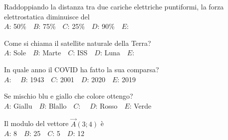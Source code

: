 \mcquestionfooter



\def\mcquestionnumber{2}


\mcquestionheader Raddoppiando la distanza tra due cariche elettriche puntiformi, la forza elettrostatica diminuisce del\\
{$A$}: 50\%\ \ {$B$}: 75\%\ \ {$C$}: 25\%\ \ {$D$}: 90\%\ \ {$E$}: \ \ 

\mcquestionfooter



\def\mcquestionnumber{3}


\mcquestionheader Come si chiama il satellite naturale della Terra?\\
{$A$}: Sole\ \ {$B$}: Marte\ \ {$C$}: ISS\ \ {$D$}: Luna\ \ {$E$}: \ \ 

\mcquestionfooter



\def\mcquestionnumber{4}


\mcquestionheader In quale anno il COVID ha fatto la sua comparsa?\\
{$A$}: \ \ {$B$}: 1943\ \ {$C$}: 2001\ \ {$D$}: 2020\ \ {$E$}: 2019\ \ 

\mcquestionfooter



\def\mcquestionnumber{5}


\mcquestionheader Se mischio blu e giallo che colore ottengo?\\
{$A$}: Giallu\ \ {$B$}: Blallo\ \ {$C$}: \ \ {$D$}: Rosso\ \ {$E$}: Verde\ \ 

\mcquestionfooter



\def\mcquestionnumber{6}


\mcquestionheader Il modulo del vettore $\vec{A}(3;4)$ è\\
{$A$}: 8\ \ {$B$}: 25\ \ {$C$}: 5\ \ {$D$}: 12\ \ 

\mcquestionfooter



\def\mcquestionnumber{7}


